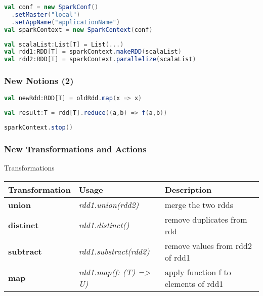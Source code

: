 \documentclass[slidetop,9pt,utf8]{beamer}
\begin{document}
\begin{CJK}{UTF8}{gbsn}
\begin{frame}[fragile]
  \begin{lstlisting}[label=InitSparkContext, caption=Init Spark Context, language=scala, style=code]
val conf = new SparkConf()
  .setMaster("local")
  .setAppName("applicationName")
val sparkContext = new SparkContext(conf)
  \end{lstlisting}

  \begin{lstlisting}[label=ListToRdd, caption=Load List as RDD, language=scala, style=code]
val scalaList:List[T] = List(...)
val rdd1:RDD[T] = sparkContext.makeRDD(scalaList)
val rdd2:RDD[T] = sparkContext.parallelize(scalaList)
  \end{lstlisting}

\end{frame}

\begin{frame}[fragile]
  \frametitle{New Notions (2)}

  \begin{lstlisting}[label=RDDTransformation, caption=Apply transformation to RDD, language=scala, style=code]
val newRdd:RDD[T] = oldRdd.map(x => x)
  \end{lstlisting}

  \begin{lstlisting}[label=RDDAction, caption=Apply action to RDD, language=scala, style=code]
val result:T = rdd[T].reduce((a,b) => f(a,b))
  \end{lstlisting}

  \begin{lstlisting}[label=StopSparkContext, caption=Stop Spark Context, language=scala, style=code]
sparkContext.stop()
  \end{lstlisting}

\end{frame}

\begin{frame}

  \frametitle{New Transformations and Actions}

  \begin{block}{Transformations}
    \begin{center}
      \begin{tabular}{|m{2.1cm}|m{3.5cm}|m{5cm}|}
        \hline 
        \rowcolor{gray} \textbf{Transformation} & \textbf{Usage} & \textbf{Description} \\ \hline
        \textbf{union} & \textit{rdd1.union(rdd2)} & merge the two rdds \\ \hline
        \textbf{distinct} & \textit{rdd1.distinct()} & remove duplicates from rdd \\ \hline
        \textbf{subtract} & \textit{rdd1.substract(rdd2)} & remove values from rdd2 of rdd1 \\ \hline
        \textbf{map} & \textit{rdd1.map(f: (T) =\textgreater\xspace U)} & apply function f to elements of rdd1 \\ \hline
      \end{tabular}
    \end{center}
  \end{block}


\end{frame}
\end{CJK}
\end{document}
